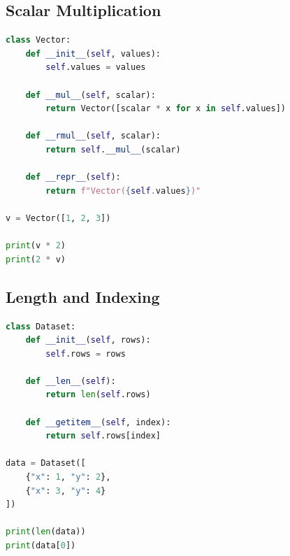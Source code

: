 \documentclass[12pt,oneside]{book}
\numberwithin{equation}{section}
\theoremstyle{definition}
\theoremstyle{plain}
\theoremstyle{remark}
\begin{document}
\subsection{Scalar Multiplication}

\begin{lstlisting}[language=Python]
class Vector:
    def __init__(self, values):
        self.values = values

    def __mul__(self, scalar):
        return Vector([scalar * x for x in self.values])

    def __rmul__(self, scalar):
        return self.__mul__(scalar)

    def __repr__(self):
        return f"Vector({self.values})"

v = Vector([1, 2, 3])

print(v * 2)
print(2 * v)
\end{lstlisting}

\subsection{Length and Indexing}

\begin{lstlisting}[language=Python]
class Dataset:
    def __init__(self, rows):
        self.rows = rows

    def __len__(self):
        return len(self.rows)

    def __getitem__(self, index):
        return self.rows[index]

data = Dataset([
    {"x": 1, "y": 2},
    {"x": 3, "y": 4}
])

print(len(data))
print(data[0])
\end{lstlisting}
\end{document}
